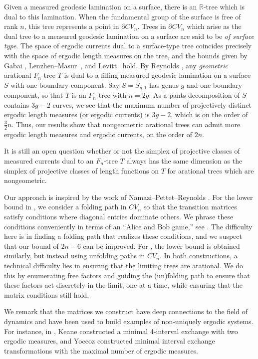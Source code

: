 \documentclass[11pt, letterpaper]{amsart}
\theoremstyle{plain}
\theoremstyle{definition}
\begin{document}
Given a measured geodesic lamination on a surface, there is an $\mathbb{R}$-tree
which is dual to this lamination. When the fundamental group of the surface is
free of rank $n$, this tree represents a point in $\partial CV_n$. Trees in
$\partial CV_n$ which arise as the dual tree to a measured geodesic lamination on a
surface are said to be \textit{of surface type}. 
The space of ergodic currents dual to a surface-type tree coincides
precisely with the space of ergodic length measures on the tree, and the bounds
given by Gabai \cite{gabai2009almost}, Lenzhen--Masur~\cite{LM2010criteria}, and Levitt~\cite{levitt1983} hold. By Reynolds
\cite{reynolds2012reducing}, any \emph{geometric} arational $F_n$-tree $T$ is
dual to a filling measured geodesic lamination on a surface $S$ with one boundary
component. Say $S=S_{g,1}$ has genus $g$ and one boundary component, so that 
$T$ is an $F_{n}$-tree with $n=2g$.  As a pants decomposition of $S$ contains $3g - 2$
curves, we see that the maximum number of projectively distinct ergodic length
measures (or ergodic currents) is $3g-2$, which is on the order of
$\frac{3}{2}n$. Thus, our results show that nongeometric arational trees can
admit more ergodic length measures and ergodic currents, on the order of $2n$.

 It is still an open question whether or not the
simplex of projective classes of measured currents dual to an
$F_n$-tree $T$ always has the same dimension as
the simplex of projective classes of length functions on $T$ for
arational trees which are nongeometric.

Our approach is inspired by the work of Namazi--Pettet--Reynolds \cite{NPR2014}.
For the lower bound in , we consider a folding path in $CV_n$ so
that the transition matrices satisfy conditions where diagonal entries dominate
others. We phrase these conditions conveniently in terms of an ``Alice and Bob
game,'' see .
The difficulty here is in finding a folding path that realizes these conditions, and we suspect that our bound of $2n-6$ can be improved. For , the lower bound is obtained similarly, but instead using unfolding paths in $CV_n$. In both constructions, a technical difficulty lies in ensuring that the limiting trees are arational. We do this by enumerating free factors and guiding the (un)folding path to ensure that these factors act discretely in the limit, one at a time, while ensuring that the matrix conditions still hold. 

We remark that the matrices we construct have deep connections to the field of dynamics and have been used to build
examples of non-uniquely ergodic systems. For instance, in
\cite{keane1977nonergodic}, Keane constructed a minimal 4-interval
exchange with two ergodic measures, and
Yoccoz \cite[Section 8.3]{yoccoz2010interval} constructed minimal interval exchange transformations with the maximal
number of ergodic measures.
\end{document}
